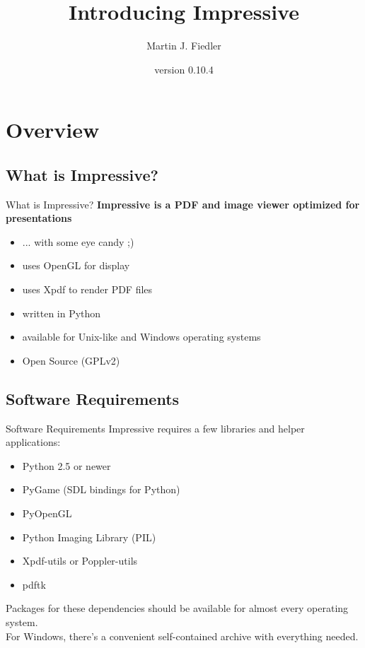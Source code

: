 \documentclass[bigger,hyperref={colorlinks=true,linkcolor=white,urlcolor=blue}]{beamer}
\title{Introducing Impressive}
\author{Martin J. Fiedler}
\date{version 0.10.4}
\begin{document}
\maketitle


\section{Overview}

\subsection{What is Impressive?}
\begin{frame}{What is Impressive?}
    \large
    \textbf{Impressive is a PDF and image viewer optimized for presentations}
    \normalsize
    \begin{itemize}
        \item ... with some eye candy ;)
        \item uses OpenGL for display
        \item uses Xpdf to render PDF files
        \item written in Python
        \item available for Unix-like and Windows operating systems
        \item Open Source (GPLv2)
    \end{itemize}
\end{frame}

\subsection{Software Requirements}
\begin{frame}{Software Requirements}
    Impressive requires a few libraries and helper applications:
    \begin{itemize}
        \item Python 2.5 or newer
        \item PyGame (SDL bindings for Python)
        \item PyOpenGL
        \item Python Imaging Library (PIL)
        \item Xpdf-utils or Poppler-utils
        \item pdftk
    \end{itemize}
    Packages for these dependencies should be available for almost every
    operating system. \\
    For Windows, there's a convenient self-contained archive with
    everything needed.
\end{frame}
\end{document}
